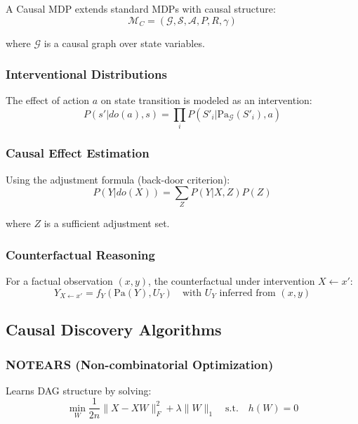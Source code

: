 \documentclass[11pt,a4paper]{article}
\begin{document}
A Causal MDP extends standard MDPs with causal structure:
\begin{equation}
  \mathcal{M}_C = (\mathcal{G}, \mathcal{S}, \mathcal{A}, P, R, \gamma)
\end{equation}

where $\mathcal{G}$ is a causal graph over state variables.

\subsubsection{Interventional Distributions}

The effect of action $a$ on state transition is modeled as an intervention:
\begin{equation}
  P(s'|do(a), s) = \prod_{i} P(S'_i | \text{Pa}_\mathcal{G}(S'_i), a)
\end{equation}

\subsubsection{Causal Effect Estimation}

Using the adjustment formula (back-door criterion):
\begin{equation}
  P(Y|do(X)) = \sum_Z P(Y|X, Z) P(Z)
\end{equation}

where $Z$ is a sufficient adjustment set.

\subsubsection{Counterfactual Reasoning}

For a factual observation $(x, y)$, the counterfactual under intervention $X \leftarrow x'$:
\begin{equation}
  Y_{X \leftarrow x'} = f_Y(\text{Pa}(Y), U_Y) \quad \text{with } U_Y \text{ inferred from } (x, y)
\end{equation}

\subsection{Causal Discovery Algorithms}

\subsubsection{NOTEARS (Non-combinatorial Optimization)}

Learns DAG structure by solving:
\begin{equation}
  \min_W \frac{1}{2n} \|X - XW\|_F^2 + \lambda \|W\|_1 \quad \text{s.t.} \quad h(W) = 0
\end{equation}
\end{document}
